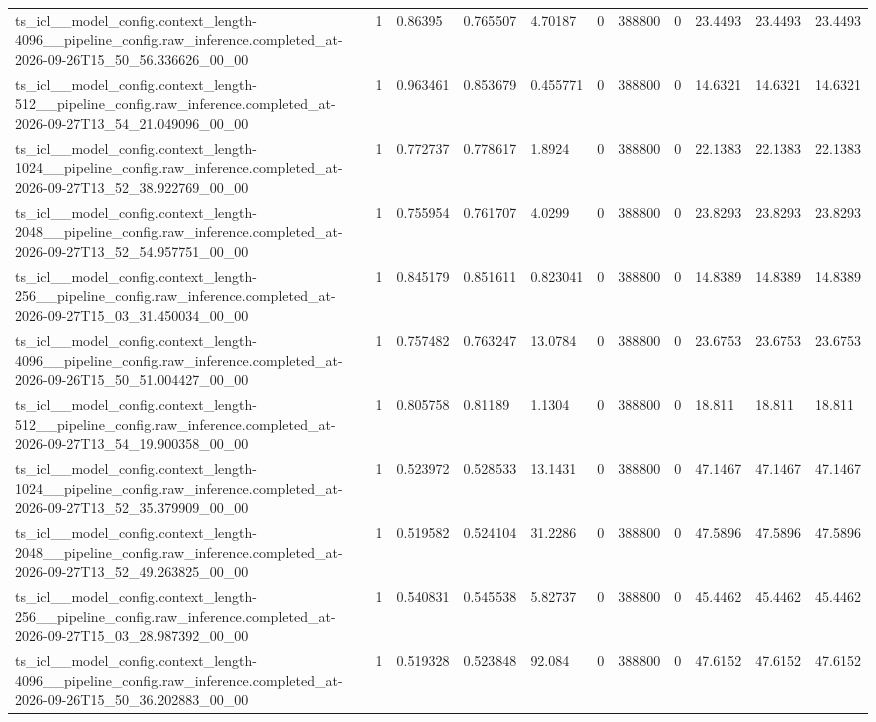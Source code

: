 \begin{tabular}{lllllllllll}
ts\_icl\_\_model\_config.context\_length-4096\_\_pipeline\_config.raw\_inference.completed\_at-2026-09-26T15\_50\_56.336626\_00\_00 & 1 & 0.86395 & 0.765507 & 4.70187 & 0 & 388800 & 0 & 23.4493 & 23.4493 & 23.4493 \\
ts\_icl\_\_model\_config.context\_length-512\_\_pipeline\_config.raw\_inference.completed\_at-2026-09-27T13\_54\_21.049096\_00\_00 & 1 & 0.963461 & 0.853679 & 0.455771 & 0 & 388800 & 0 & 14.6321 & 14.6321 & 14.6321 \\
ts\_icl\_\_model\_config.context\_length-1024\_\_pipeline\_config.raw\_inference.completed\_at-2026-09-27T13\_52\_38.922769\_00\_00 & 1 & 0.772737 & 0.778617 & 1.8924 & 0 & 388800 & 0 & 22.1383 & 22.1383 & 22.1383 \\
ts\_icl\_\_model\_config.context\_length-2048\_\_pipeline\_config.raw\_inference.completed\_at-2026-09-27T13\_52\_54.957751\_00\_00 & 1 & 0.755954 & 0.761707 & 4.0299 & 0 & 388800 & 0 & 23.8293 & 23.8293 & 23.8293 \\
ts\_icl\_\_model\_config.context\_length-256\_\_pipeline\_config.raw\_inference.completed\_at-2026-09-27T15\_03\_31.450034\_00\_00 & 1 & 0.845179 & 0.851611 & 0.823041 & 0 & 388800 & 0 & 14.8389 & 14.8389 & 14.8389 \\
ts\_icl\_\_model\_config.context\_length-4096\_\_pipeline\_config.raw\_inference.completed\_at-2026-09-26T15\_50\_51.004427\_00\_00 & 1 & 0.757482 & 0.763247 & 13.0784 & 0 & 388800 & 0 & 23.6753 & 23.6753 & 23.6753 \\
ts\_icl\_\_model\_config.context\_length-512\_\_pipeline\_config.raw\_inference.completed\_at-2026-09-27T13\_54\_19.900358\_00\_00 & 1 & 0.805758 & 0.81189 & 1.1304 & 0 & 388800 & 0 & 18.811 & 18.811 & 18.811 \\
ts\_icl\_\_model\_config.context\_length-1024\_\_pipeline\_config.raw\_inference.completed\_at-2026-09-27T13\_52\_35.379909\_00\_00 & 1 & 0.523972 & 0.528533 & 13.1431 & 0 & 388800 & 0 & 47.1467 & 47.1467 & 47.1467 \\
ts\_icl\_\_model\_config.context\_length-2048\_\_pipeline\_config.raw\_inference.completed\_at-2026-09-27T13\_52\_49.263825\_00\_00 & 1 & 0.519582 & 0.524104 & 31.2286 & 0 & 388800 & 0 & 47.5896 & 47.5896 & 47.5896 \\
ts\_icl\_\_model\_config.context\_length-256\_\_pipeline\_config.raw\_inference.completed\_at-2026-09-27T15\_03\_28.987392\_00\_00 & 1 & 0.540831 & 0.545538 & 5.82737 & 0 & 388800 & 0 & 45.4462 & 45.4462 & 45.4462 \\
ts\_icl\_\_model\_config.context\_length-4096\_\_pipeline\_config.raw\_inference.completed\_at-2026-09-26T15\_50\_36.202883\_00\_00 & 1 & 0.519328 & 0.523848 & 92.084 & 0 & 388800 & 0 & 47.6152 & 47.6152 & 47.6152 \\

\end{tabular}
